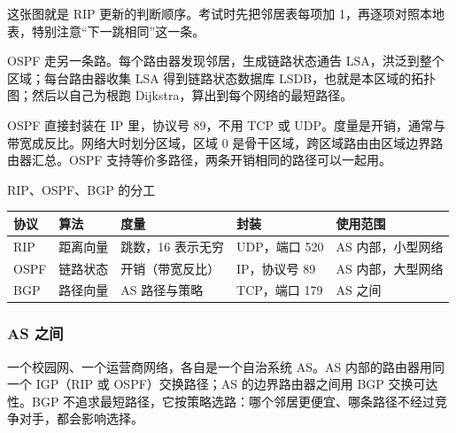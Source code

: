 这张图就是 RIP 更新的判断顺序。考试时先把邻居表每项加 1，再逐项对照本地表，特别注意“下一跳相同”这一条。

OSPF 走另一条路。每个路由器发现邻居，生成链路状态通告 LSA，洪泛到整个区域；每台路由器收集 LSA 得到链路状态数据库 LSDB，也就是本区域的拓扑图；然后以自己为根跑 Dijkstra，算出到每个网络的最短路径。

OSPF 直接封装在 IP 里，协议号 89，不用 TCP 或 UDP。度量是开销，通常与带宽成反比。网络大时划分区域，区域 0 是骨干区域，跨区域路由由区域边界路由器汇总。OSPF 支持等价多路径，两条开销相同的路径可以一起用。

\begin{tablebox}{RIP、OSPF、BGP 的分工}
\centering
\small
\begin{tabularx}{\linewidth}{|p{1.7cm}|p{2.4cm}|p{3.1cm}|p{3.1cm}|X|}
\hline
协议 & 算法 & 度量 & 封装 & 使用范围 \\
\hline
RIP & 距离向量 & 跳数，16 表示无穷 & UDP，端口 520 & AS 内部，小型网络 \\
OSPF & 链路状态 & 开销（带宽反比） & IP，协议号 89 & AS 内部，大型网络 \\
BGP & 路径向量 & AS 路径与策略 & TCP，端口 179 & AS 之间 \\
\hline
\end{tabularx}
\end{tablebox}

\subsubsection{AS 之间}

一个校园网、一个运营商网络，各自是一个自治系统 AS。AS 内部的路由器用同一个 IGP（RIP 或 OSPF）交换路径；AS 的边界路由器之间用 BGP 交换可达性。BGP 不追求最短路径，它按策略选路：哪个邻居更便宜、哪条路径不经过竞争对手，都会影响选择。

